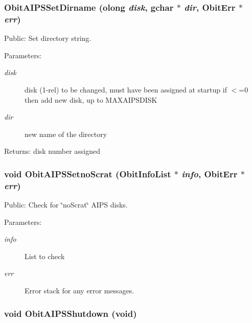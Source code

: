 \subsubsection{ Obit\-AIPSSet\-Dirname ({\bf olong} {\em disk}, gchar $\ast$ {\em dir}, {\bf Obit\-Err} $\ast$ {\em err})}\label{ObitAIPS_8c_a8}


Public: Set directory string. 

\begin{Desc}
\item[Parameters:]
\begin{description}
\item[{\em disk}]disk (1-rel) to be changed, must have been assigned at startup if $<$=0 then add new disk, up to MAXAIPSDISK \item[{\em dir}]new name of the directory \end{description}
\end{Desc}
\begin{Desc}
\item[Returns:]disk number assigned \end{Desc}
\subsubsection{\setlength{\rightskip}{0pt plus 5cm}void Obit\-AIPSSetno\-Scrat ({\bf Obit\-Info\-List} $\ast$ {\em info}, {\bf Obit\-Err} $\ast$ {\em err})}\label{ObitAIPS_8c_a23}


Public: Check for \char`\"{}no\-Scrat\char`\"{} AIPS disks. 

\begin{Desc}
\item[Parameters:]
\begin{description}
\item[{\em info}]List to check \item[{\em err}]Error stack for any error messages. \end{description}
\end{Desc}
\subsubsection{\setlength{\rightskip}{0pt plus 5cm}void Obit\-AIPSShutdown (void)}\label{ObitAIPS_8c_a6}


